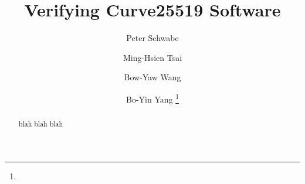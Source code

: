 \documentclass{llncs}
\title{Verifying Curve25519 Software}
\author{
Peter Schwabe\inst{2}
\and
Ming-Hsien Tsai\inst{1}
\and
Bow-Yaw Wang\inst{1}
\and
Bo-Yin Yang\inst{1}
%
\thanks{}
}
\institute
{
Institute of Information Science\\
Academia Sinica\\
128 Section 2 Academia Road, Taipei 115-29, Taiwan\\
\email{mhtsai208@gmail.com, bywang@iis.sinica.edu.tw, by@crypto.tw}
\and
Radboud University Nijmegen\\
Digital Security Group\\
PO Box 9010, 6500GL Nijmegen, The Netherlands\\
\email{peter@cryptojedi.org}
}
\author{\vspace*{-1cm} }
\institute{\vspace*{-1cm}\ }
\begin{document}
\maketitle

\begin{abstract}
  blah blah blah
\end{abstract}



%


\end{document}
